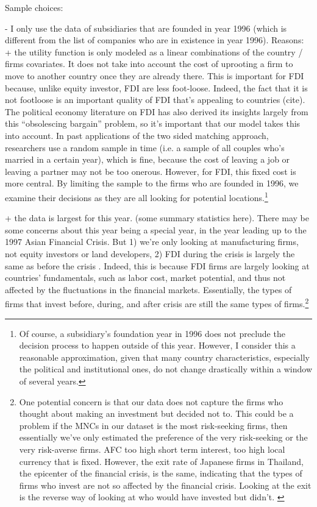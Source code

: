 Sample choices:

- I only use the data of subsidiaries that are founded in year 1996 (which is
different from the list of companies who are in existence in year 1996). Reasons:
+ the utility function is only modeled as a linear combinations of the country /
firms covariates. It does not take into account the cost of uprooting a firm to
move to another country once they are already there. This is important for FDI
because, unlike equity investor, FDI are less foot-loose. Indeed, the fact that
it is not footloose is an important quality of FDI that's appealing to countries
(cite). The political economy literature on FDI has also derived its insights
largely from this ``obsolescing bargain'' problem, so it's important that our
model takes this into account. In past applications of the two sided matching
approach, researchers use a random sample in time (i.e. a sample of all couples
who's married in a certain year), which is fine, because the
cost of leaving a job or leaving a partner may not be too onerous. However, for
FDI, this fixed cost is more central. By limiting the sample to the firms who
are founded in 1996, we examine their decisions as they are all looking for
potential locations.\footnote{Of course, a subsidiary's foundation year in 1996
  does not preclude the decision process to happen outside of this year.
  However, I consider this a reasonable approximation, given that many country
  characteristics, especially the political and institutional ones, do not
  change drastically within a window of several years.}

+ the data is largest for this year. (some summary statistics here). There may
be some concerns about this year being a special year, in the year leading up to
the 1997 Asian Financial Crisis. But 1) we're only looking at manufacturing
firms, not equity investors or land developers, 2) FDI during the crisis is
largely the same as before the crisis \citep{UNCTAD1998}. Indeed, this is
because FDI firms are largely looking at countries' fundamentals, such as labor
cost, market potential, and thus not affected by the fluctuations in the
financial markets. Essentially, the types of firms that invest before, during,
and after crisis are still the same types of firms.\footnote{One potential
  concern is that our data does not capture the firms who thought about making
  an investment but decided not to. This could be a problem if the MNCs in our
  dataset is the most risk-seeking firms, then essentially we've only estimated
  the preference of the very risk-seeking or the very risk-averse firms. AFC too
high short term interest, too high local currency that is fixed. However, the
exit rate of Japanese firms in Thailand, the epicenter of the financial crisis,
is the same, indicating that the types of firms who invest are not so affected
by the financial crisis. Looking at the exit is the reverse way of looking at
who would have invested but didn't. \citep{Delios2001}}

